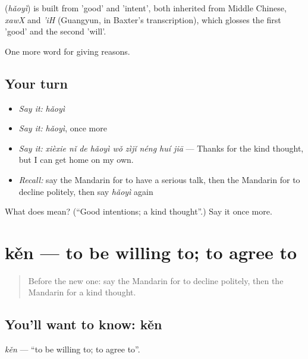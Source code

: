 \begin{cousinweb}
\textbf{} (\emph{hǎoyì}) is built from  'good' and  'intent', both inherited from Middle Chinese, \emph{xawX} and \emph{'iH} (Guangyun, in Baxter's transcription), which glosses the first 'good' and the second 'will'.
\end{cousinweb}

\begin{grammarlens}[title={What you've built}]
One more word for giving reasons.
\end{grammarlens}

\subsection*{Your turn}
\begin{itemize}
\raggedright
  \item \emph{Say it:} \emph{hǎoyì}
  \item \emph{Say it:} \emph{hǎoyì}, once more
  \item \emph{Say it:} \emph{xièxie nǐ de hǎoyì wǒ zìjǐ néng huí jiā} — Thanks for the kind thought, but I can get home on my own.
  \item \emph{Recall:} say the Mandarin for to have a serious talk, then the Mandarin for to decline politely, then say \emph{hǎoyì} again
\end{itemize}

\begin{tcolorbox}[breakable,colback=teal!4,colframe=teal!35!black,title={Before you move on}]
What does  mean? (\textquotedblleft{}Good intentions; a kind thought\textquotedblright{}.) Say it once more.
\end{tcolorbox}
\section[kěn]{kěn — to be willing to; to agree to}

\label{lesson:ZH-C355-ken}



\begin{quote}
Before the new one: say the Mandarin for to decline politely, then the Mandarin for a kind thought.
\end{quote}

\subsection*{You'll want to know: kěn}
\emph{kěn} — \textquotedblleft{}to be willing to; to agree to\textquotedblright{}.


